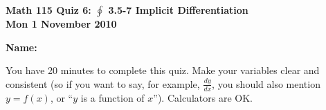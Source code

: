 \documentclass[11pt,letterpaper]{article}
\begin{document}
\flushleft
\begin{multicols}{2}


\begin{large}\textbf{Math 115 Quiz 6: $\oint $ 3.5-7 Implicit Differentiation \\
Mon 1 November 2010}\end{large}

\textbf{Name:  }\underline{\hspace{35ex}}

\vspace{.5in}

\end{multicols}

\pagestyle{empty}

\flushleft

You have 20 minutes to complete this quiz.  Make your variables clear and
consistent (so if you want to say, for example, $\frac{dy}{dx}$, you should also
mention $y=f(x)$, or ``$y$ is a function of $x$'').  Calculators are OK.  
\end{document}
